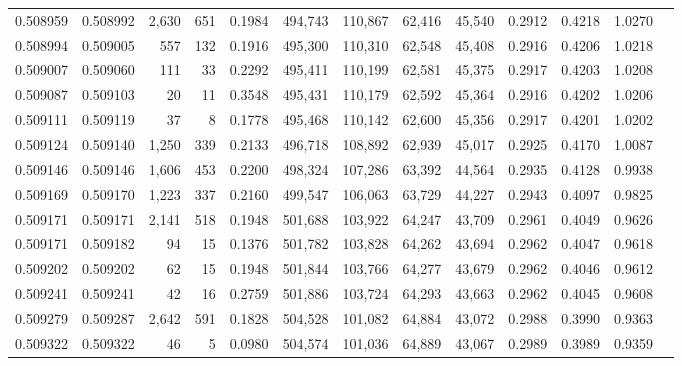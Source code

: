 \begin{tabular}{rrrrrrrrrrrrr}
0.508959 & 0.508992 & 2,630 &   651 &                                     0.1984 & 494,743 & 110,867 &  62,416 &  45,540 & 0.2912 & 0.4218 & 1.0270 \\
0.508994 & 0.509005 &   557 &   132 &                                     0.1916 & 495,300 & 110,310 &  62,548 &  45,408 & 0.2916 & 0.4206 & 1.0218 \\
0.509007 & 0.509060 &   111 &    33 &                                     0.2292 & 495,411 & 110,199 &  62,581 &  45,375 & 0.2917 & 0.4203 & 1.0208 \\
0.509087 & 0.509103 &    20 &    11 &                                     0.3548 & 495,431 & 110,179 &  62,592 &  45,364 & 0.2916 & 0.4202 & 1.0206 \\
0.509111 & 0.509119 &    37 &     8 &                                     0.1778 & 495,468 & 110,142 &  62,600 &  45,356 & 0.2917 & 0.4201 & 1.0202 \\
0.509124 & 0.509140 & 1,250 &   339 &                                     0.2133 & 496,718 & 108,892 &  62,939 &  45,017 & 0.2925 & 0.4170 & 1.0087 \\
0.509146 & 0.509146 & 1,606 &   453 &                                     0.2200 & 498,324 & 107,286 &  63,392 &  44,564 & 0.2935 & 0.4128 & 0.9938 \\
0.509169 & 0.509170 & 1,223 &   337 &                                     0.2160 & 499,547 & 106,063 &  63,729 &  44,227 & 0.2943 & 0.4097 & 0.9825 \\
0.509171 & 0.509171 & 2,141 &   518 &                                     0.1948 & 501,688 & 103,922 &  64,247 &  43,709 & 0.2961 & 0.4049 & 0.9626 \\
0.509171 & 0.509182 &    94 &    15 &                                     0.1376 & 501,782 & 103,828 &  64,262 &  43,694 & 0.2962 & 0.4047 & 0.9618 \\
0.509202 & 0.509202 &    62 &    15 &                                     0.1948 & 501,844 & 103,766 &  64,277 &  43,679 & 0.2962 & 0.4046 & 0.9612 \\
0.509241 & 0.509241 &    42 &    16 &                                     0.2759 & 501,886 & 103,724 &  64,293 &  43,663 & 0.2962 & 0.4045 & 0.9608 \\
0.509279 & 0.509287 & 2,642 &   591 &                                     0.1828 & 504,528 & 101,082 &  64,884 &  43,072 & 0.2988 & 0.3990 & 0.9363 \\
0.509322 & 0.509322 &    46 &     5 &                                     0.0980 & 504,574 & 101,036 &  64,889 &  43,067 & 0.2989 & 0.3989 & 0.9359 \\

\end{tabular}
